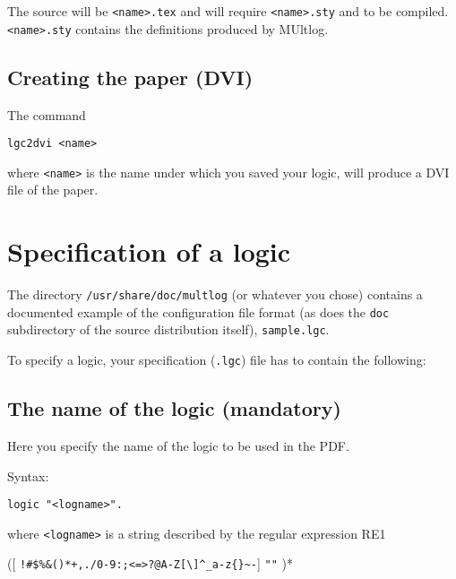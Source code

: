\documentclass[]{article}
\begin{document}
The source will be \texttt{\textless{}name\textgreater{}.tex} and will
require \texttt{\textless{}name\textgreater{}.sty} and to be compiled.
\texttt{\textless{}name\textgreater{}.sty} contains the definitions
produced by MUltlog.

\hypertarget{creating-the-paper-dvi}{%
\subsection{Creating the paper (DVI)}\label{creating-the-paper-dvi}}

The command

\begin{verbatim}
lgc2dvi <name>
\end{verbatim}

where \texttt{\textless{}name\textgreater{}} is the name under which you
saved your logic, will produce a DVI file of the paper.

\hypertarget{specification-of-a-logic}{%
\section{Specification of a logic}\label{specification-of-a-logic}}

The directory \texttt{/usr/share/doc/multlog} (or whatever you chose)
contains a documented example of the configuration file format (as does
the \texttt{doc} subdirectory of the source distribution itself),
\texttt{sample.lgc}.

To specify a logic, your specification (\texttt{.lgc}) file has to
contain the following:

\hypertarget{the-name-of-the-logic-mandatory}{%
\subsection{The name of the logic
(mandatory)}\label{the-name-of-the-logic-mandatory}}

Here you specify the name of the logic to be used in the PDF.

Syntax:

\begin{verbatim}
logic "<logname>".
\end{verbatim}

where \texttt{\textless{}logname\textgreater{}} is a string described by
the regular expression RE1

({[}
\texttt{!\#\$\%\&\textquotesingle{}()*+,./0-9:;\textless{}=\textgreater{}?@A-Z{[}\textbackslash{}{]}\^{}\_\textasciigrave{}a-z\{\textbar{}\}\textasciitilde{}-}{]}
\textbar{} \texttt{""} )*
\end{document}
